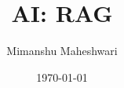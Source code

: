 \documentclass{report}
\title{\textbf{AI: RAG}}
\author{Mimanshu Maheshwari}
\date{\today}
\begin{document}
\maketitle
\tableofcontents
\listoffigures
\lstlistoflistings










\printglossaries
\end{document}
